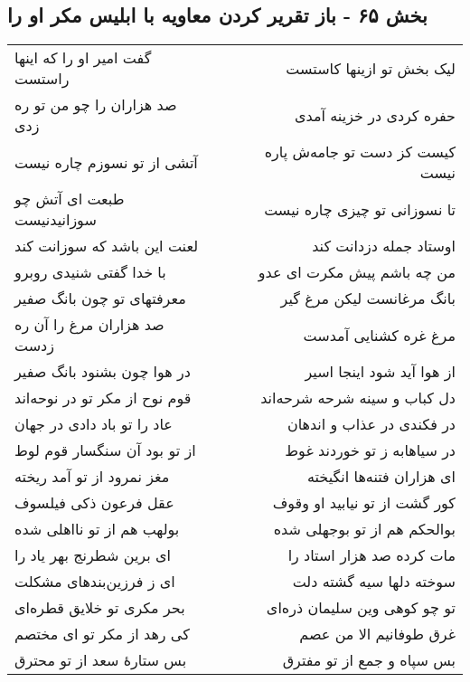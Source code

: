 \begin{center}
\section*{بخش ۶۵ - باز تقریر کردن معاویه با ابلیس مکر او را}
\label{sec:sh065}
\begin{longtable}{l p{0.5cm} r}
گفت امیر او را که اینها راستست
&&
لیک بخش تو ازینها کاستست
\\
صد هزاران را چو من تو ره زدی
&&
حفره کردی در خزینه آمدی
\\
آتشی از تو نسوزم چاره نیست
&&
کیست کز دست تو جامه‌ش پاره نیست
\\
طبعت ای آتش چو سوزانیدنیست
&&
تا نسوزانی تو چیزی چاره نیست
\\
لعنت این باشد که سوزانت کند
&&
اوستاد جمله دزدانت کند
\\
با خدا گفتی شنیدی روبرو
&&
من چه باشم پیش مکرت ای عدو
\\
معرفتهای تو چون بانگ صفیر
&&
بانگ مرغانست لیکن مرغ گیر
\\
صد هزاران مرغ را آن ره زدست
&&
مرغ غره کشنایی آمدست
\\
در هوا چون بشنود بانگ صفیر
&&
از هوا آید شود اینجا اسیر
\\
قوم نوح از مکر تو در نوحه‌اند
&&
دل کباب و سینه شرحه شرحه‌اند
\\
عاد را تو باد دادی در جهان
&&
در فکندی در عذاب و اندهان
\\
از تو بود آن سنگسار قوم لوط
&&
در سیاهابه ز تو خوردند غوط
\\
مغز نمرود از تو آمد ریخته
&&
ای هزاران فتنه‌ها انگیخته
\\
عقل فرعون ذکی فیلسوف
&&
کور گشت از تو نیابید او وقوف
\\
بولهب هم از تو نااهلی شده
&&
بوالحکم هم از تو بوجهلی شده
\\
ای برین شطرنج بهر یاد را
&&
مات کرده صد هزار استاد را
\\
ای ز فرزین‌بندهای مشکلت
&&
سوخته دلها سیه گشته دلت
\\
بحر مکری تو خلایق قطره‌ای
&&
تو چو کوهی وین سلیمان ذره‌ای
\\
کی رهد از مکر تو ای مختصم
&&
غرق طوفانیم الا من عصم
\\
بس ستارهٔ سعد از تو محترق
&&
بس سپاه و جمع از تو مفترق
\\
\end{longtable}
\end{center}
